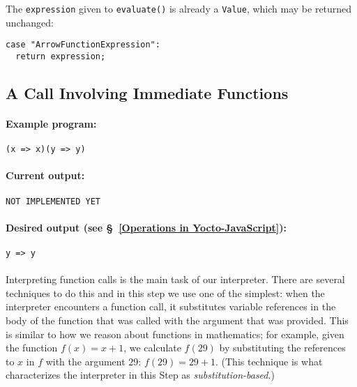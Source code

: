 \documentclass[12pt, oneside]{book}
\begin{document}
The \texttt{expression} given to \texttt{evaluate()} is already a \texttt{Value}, which may be returned unchanged:

\begin{verbatim}
case "ArrowFunctionExpression":
  return expression;
\end{verbatim}

\subsection{A Call Involving Immediate Functions}
\label{A Call Involving Immediate Functions}

\paragraph{Example program:}

\begin{verbatim}
(x => x)(y => y)
\end{verbatim}

\paragraph{Current output:}

\begin{verbatim}
NOT IMPLEMENTED YET
\end{verbatim}

\paragraph{Desired output (see §~\ref{Operations in Yocto-JavaScript}):}

\begin{verbatim}
y => y
\end{verbatim}

\paragraph{}

Interpreting function calls is the main task of our interpreter. There are several techniques to do this and in this step we use one of the simplest: when the interpreter encounters a function call, it substitutes variable references in the body of the function that was called with the argument that was provided. This is similar to how we reason about functions in mathematics; for example, given the function $f(x) = x + 1$, we calculate $f(29)$ by substituting the references to $x$ in $f$ with the argument $29$: $f(29) = 29 + 1$. (This technique is what characterizes the interpreter in this Step as \emph{substitution-based}.)
\end{document}
